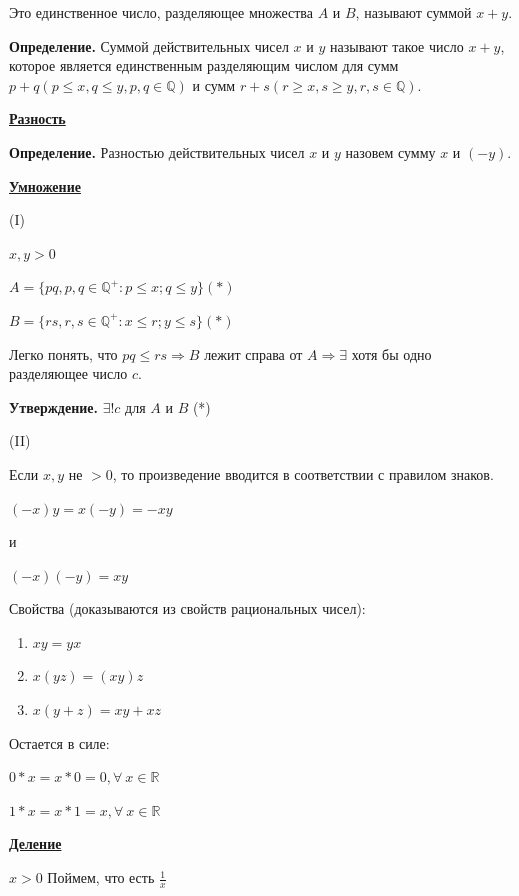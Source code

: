 \documentclass{article}
\begin{document}
        Это единственное число, разделяющее множества $A$ и $B$, называют суммой $x + y$.

        \textbf{Определение.} Суммой действительных чисел $x$ и $y$ называют такое число $x + y$, которое является единственным разделяющим числом для сумм $p + q (p \leq x, q \leq y, p,q \in \mathbb{Q})$ и сумм $r+s (r \geq x, s \geq y, r,s \in \mathbb{Q})$.
        
        \textbf{\underline{Разность}}

        \textbf{Определение.} Разностью действительных чисел $x$ и $y$ назовем сумму $x$ и $(-y)$.
        
        \textbf{\underline{Умножение}}

        (I)

        $x, y > 0$

        $A = \{pq, p, q \in \mathbb{Q}^{+}: p \leq x; q \leq y\} (*)$

        $B = \{rs, r, s \in \mathbb{Q}^{+}: x \leq r; y \leq s\} (*)$

        Легко понять, что $pq \leq rs \Rightarrow B$ лежит справа от $A \Rightarrow \exists$ хотя бы одно разделяющее число $c$.

        \textbf{Утверждение.} $\exists! c$ для $A$ и $B$ (*)

        (II)

        Если $x, y$ не $> 0$, то произведение вводится в соответствии с правилом знаков. 

        $(-x)y = x(-y) = -xy$

        и 

        $(-x)(-y) = xy$

        Свойства (доказываются из свойств рациональных чисел):

        \begin{enumerate}
            \item $xy = yx$
            \item $x(yz) = (xy)z$
            \item $x(y + z) = xy + xz$
        \end{enumerate}

        Остается в силе:

        $0 * x = x * 0 = 0, \forall\ x \in \mathbb{R}$

        $1 * x = x * 1 = x, \forall\ x \in \mathbb{R}$

        \textbf{\underline{Деление}}

        $x > 0$ Поймем, что есть $\frac{1}{x}$
\end{document}

